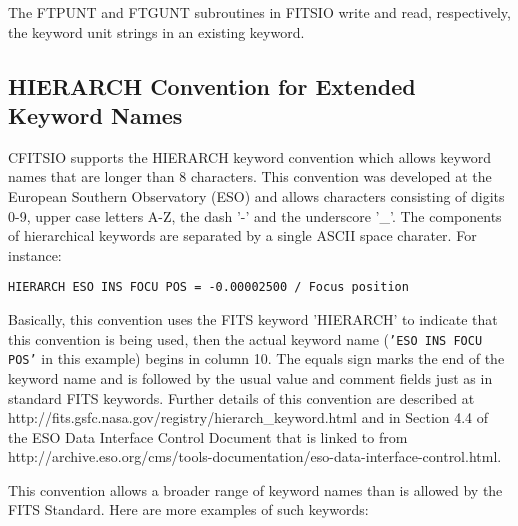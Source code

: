 \documentclass[11pt]{book}
\begin{document}
The FTPUNT and FTGUNT subroutines in FITSIO write and read,
respectively, the keyword unit strings in an existing keyword.


\subsection{HIERARCH Convention for Extended Keyword Names}

CFITSIO supports the HIERARCH keyword convention which allows keyword
names that are longer than 8 characters.  This convention
was developed at the European Southern Observatory (ESO) and allows characters
consisting of digits 0-9, upper case letters A-Z, the dash '-' and the underscore '\_'.
The components of hierarchical keywords are separated by a single ASCII space charater.
For instance:

\begin{verbatim}
HIERARCH ESO INS FOCU POS = -0.00002500 / Focus position
\end{verbatim}
Basically, this convention uses the FITS keyword 'HIERARCH' to indicate
that this convention is being used, then the actual keyword name
({\tt'ESO INS FOCU POS'} in this example) begins in column 10.  The
equals sign marks the end of the keyword name and is followed by the
usual value and comment fields just as in standard FITS keywords.
Further details of this convention are described at
http://fits.gsfc.nasa.gov/registry/hierarch\_keyword.html
and in Section 4.4 of the ESO Data Interface Control Document that
is linked to from
http://archive.eso.org/cms/tools-documentation/eso-data-interface-control.html.

This convention allows a broader range of keyword names
than is allowed by the FITS Standard.  Here are more examples
of such keywords:
\end{document}
